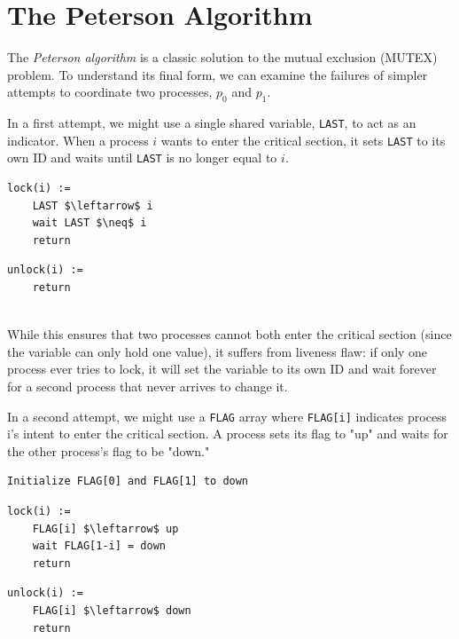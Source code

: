 \section{The Peterson Algorithm}
The \textit{Peterson algorithm} is a classic solution to the mutual exclusion (MUTEX) problem. To understand its final form, we can examine the failures of simpler attempts to coordinate two processes, $p_0$ and $p_1$.

In a first attempt, we might use a single shared variable, \texttt{LAST}, to act as an indicator. When a process $i$ wants to enter the critical section, it sets \texttt{LAST} to its own ID and waits until \texttt{LAST} is no longer equal to $i$. 

\begin{minipage}{\textwidth}
\begin{minipage}{0.45\textwidth}
\begin{lstlisting}[mathescape]
lock(i) :=
    LAST $\leftarrow$ i
    wait LAST $\neq$ i
    return
\end{lstlisting}
\end{minipage}
\hfill
\begin{minipage}{0.45\textwidth}
\begin{lstlisting}[mathescape]
unlock(i) :=
    return
\end{lstlisting}
\end{minipage}
\end{minipage}\\

While this ensures that two processes cannot both enter the critical section (since the variable can only hold one value), it suffers from liveness flaw: if only one process ever tries to lock, it will set the variable to its own ID and wait forever for a second process that never arrives to change it.

In a second attempt, we might use a \texttt{FLAG} array where \texttt{FLAG[i]} indicates process i's intent to enter the critical section. A process sets its flag to "up" and waits for the other process's flag to be "down." 

\begin{minipage}{\textwidth}
\begin{lstlisting}[mathescape]
Initialize FLAG[0] and FLAG[1] to down
\end{lstlisting}
\begin{minipage}{0.45\textwidth}
\begin{lstlisting}[mathescape]
lock(i) :=
    FLAG[i] $\leftarrow$ up
    wait FLAG[1-i] = down
    return
\end{lstlisting}
\end{minipage}
\hfill
\begin{minipage}{0.45\textwidth}
\begin{lstlisting}[mathescape]
unlock(i) :=
    FLAG[i] $\leftarrow$ down
    return
\end{lstlisting}
\end{minipage}
\end{minipage}\\

